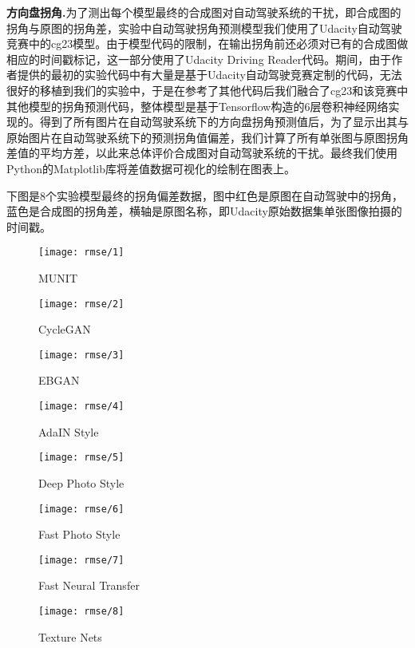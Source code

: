 \textbf{方向盘拐角.}\quad 为了测出每个模型最终的合成图对自动驾驶系统的干扰，即合成图的拐角与原图的拐角差，实验中自动驾驶拐角预测模型我们使用了Udacity自动驾驶竞赛中的cg23\cite{cg23}模型。由于模型代码的限制，在输出拐角前还必须对已有的合成图做相应的时间戳标记，这一部分使用了Udacity Driving Reader代码\cite{git:udr}。期间，由于作者提供的最初的实验代码中有大量是基于Udacity自动驾驶竞赛定制的代码，无法很好的移植到我们的实验中，于是在参考了其他代码后我们融合了cg23和该竞赛中其他模型的拐角预测代码，整体模型是基于Tensorflow构造的6层卷积神经网络实现的。得到了所有图片在自动驾驶系统下的方向盘拐角预测值后，为了显示出其与原始图片在自动驾驶系统下的预测拐角值偏差，我们计算了所有单张图与原图拐角差值的平均方差，以此来总体评价合成图对自动驾驶系统的干扰。最终我们使用Python的Matplotlib库将差值数据可视化的绘制在图表上。

下图是8个实验模型最终的拐角偏差数据，图中红色是原图在自动驾驶中的拐角，蓝色是合成图的拐角差，横轴是原图名称，即Udacity原始数据集单张图像拍摄的时间戳。

\begin{figure}[H]
    \texttt{[image: rmse/1]} 
    \caption{MUNIT}
\end{figure}
\begin{figure}[H]
    \texttt{[image: rmse/2]} 
    \caption{CycleGAN}
\end{figure}
\begin{figure}[H]
    \texttt{[image: rmse/3]} 
    \caption{EBGAN}
\end{figure}
\begin{figure}[H]
    \texttt{[image: rmse/4]} 
    \caption{AdaIN Style}
\end{figure}
\begin{figure}[H]
    \texttt{[image: rmse/5]} 
    \caption{Deep Photo Style}
\end{figure}
\begin{figure}[H]
    \texttt{[image: rmse/6]} 
    \caption{Fast Photo Style}
\end{figure}
\begin{figure}[H]
    \texttt{[image: rmse/7]} 
    \caption{Fast Neural Transfer}
\end{figure}
\begin{figure}[H]
    \texttt{[image: rmse/8]} 
    \caption{Texture Nets}
\end{figure}

